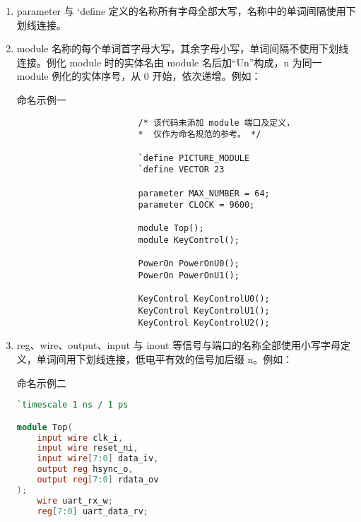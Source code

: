 \documentclass[utf-8, 10pt, a4paper, titlepage, oneside, onecolumn, openany]{ctexart} %
\begin{document}
		\begin{enumerate}
			\item parameter 与 {`}define 定义的名称所有字母全部大写，名称中的单词间隔使用下划线连接。 %
			
			\item module 名称的每个单词首字母大写，其余字母小写，单词间隔不使用下划线连接。例化 module 时的实体名由 module 名后加“Un”构成，n 为同一 module 例化的实体序号，从 0 开始，依次递增。例如：

				\begin{table}[h]
					\caption{命名示例一} \label{命名示例一}
				\end{table}

				\begin{shaded}
					\begin{verbatim}
						/* 该代码未添加 module 端口及定义，
						*  仅作为命名规范的参考。 */

						`define PICTURE_MODULE
						`define VECTOR 23
						
						parameter MAX_NUMBER = 64;
						parameter CLOCK = 9600;

						module Top();
						module KeyControl();

						PowerOn PowerOnU0();
						PowerOn PowerOnU1();
						
						KeyControl KeyControlU0();
						KeyControl KeyControlU1();
						KeyControl KeyControlU2();
					\end{verbatim}
				\end{shaded}

			\clearpage
				
			\item reg、wire、output、input 与 inout 等信号与端口的名称全部使用小写字母定义，单词间用下划线连接，低电平有效的信号加后缀 n。例如：

				\begin{table}[h]
					\caption{命名示例二} \label{命名示例二}
				\end{table}

\begin{lstlisting}[language = Verilog]
`timescale 1 ns / 1 ps

module Top(
	input wire clk_i,
	input wire reset_ni,
	input wire[7:0] data_iv,
	output reg hsync_o,
	output reg[7:0] rdata_ov
);
	wire uart_rx_w;
	reg[7:0] uart_data_rv;


\end{lstlisting}
\end{enumerate}
\end{document}
